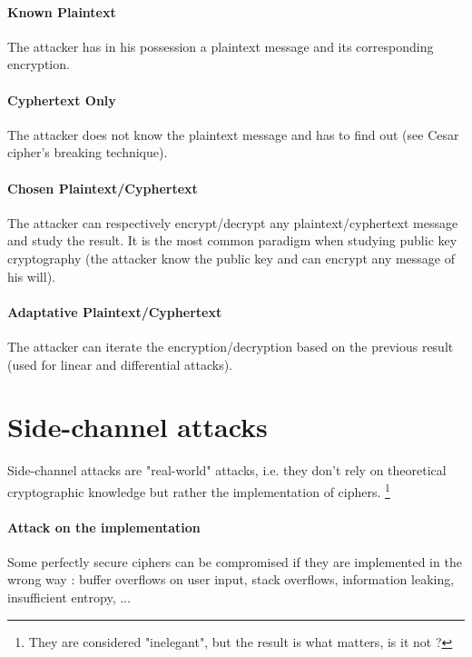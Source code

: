 \paragraph{Known Plaintext  \\} The attacker has in his possession a plaintext message and its corresponding encryption.

\paragraph{Cyphertext Only  \\} The attacker does not know the plaintext message and has to find out (see Cesar cipher's breaking technique).

\paragraph{Chosen Plaintext/Cyphertext \\} 
The attacker can respectively encrypt/decrypt any plaintext/cyphertext message and study the result. It is the most common paradigm when studying public key cryptography (the attacker know the public key and can encrypt any message of his will).

\paragraph{Adaptative Plaintext/Cyphertext \\} 
The attacker can iterate the encryption/decryption based on the previous result (used for linear and differential attacks).

\section{Side-channel attacks}
Side-channel attacks are "real-world" attacks, i.e. they don't rely on theoretical cryptographic knowledge but rather the implementation of ciphers. \footnote{ They are considered "inelegant", but the result is what matters, is it not ?}

\paragraph{Attack on the implementation \\}
Some perfectly secure ciphers can be compromised if they are implemented in the wrong way : buffer overflows on user input, stack overflows, information leaking, insufficient entropy, ...   

